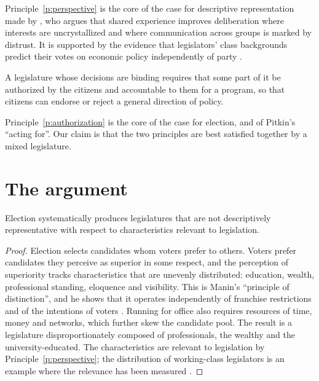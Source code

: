 \documentclass{situationist-preprint}
\begin{document}
Principle~\ref{p:perspective} is the core of the case for descriptive representation made by \citet{Mansbridge1999}, who argues that shared experience improves deliberation where interests are uncrystallized and where communication across groups is marked by distrust. It is supported by the evidence that legislators' class backgrounds predict their votes on economic policy independently of party \citep{Carnes2013}.

\begin{principle}[Authorization]\label{p:authorization}
A legislature whose decisions are binding requires that some part of it be authorized by the citizens and accountable to them for a program, so that citizens can endorse or reject a general direction of policy.
\end{principle}

Principle~\ref{p:authorization} is the core of the case for election, and of Pitkin's \enquote{acting for}. Our claim is that the two principles are best satisfied together by a mixed legislature.

\section{The argument}

\begin{lemma}\label{l:election}
Election systematically produces legislatures that are not descriptively representative with respect to characteristics relevant to legislation.
\end{lemma}

\begin{proof}
Election selects candidates whom voters prefer to others. Voters prefer candidates they perceive as superior in some respect, and the perception of superiority tracks characteristics that are unevenly distributed: education, wealth, professional standing, eloquence and visibility. This is Manin's \enquote{principle of distinction}, and he shows that it operates independently of franchise restrictions and of the intentions of voters \citep{Manin1997}. Running for office also requires resources of time, money and networks, which further skew the candidate pool. The result is a legislature disproportionately composed of professionals, the wealthy and the university-educated. The characteristics are relevant to legislation by Principle~\ref{p:perspective}; the distribution of working-class legislators is an example where the relevance has been measured \citep{Carnes2013}.
\end{proof}
\end{document}
